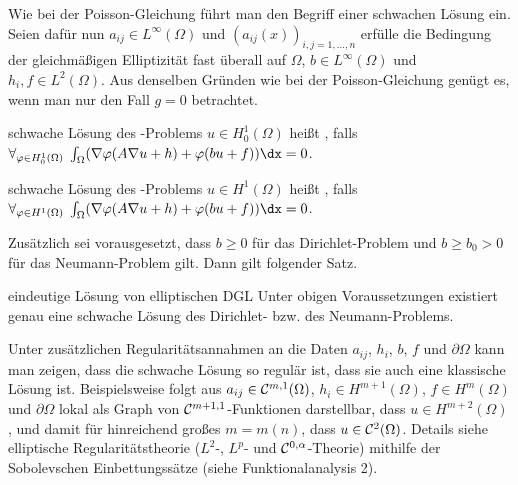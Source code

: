 \linie
\pagebreak

\begin{Bem}
    Wie bei der Poisson-Gleichung führt man den Begriff einer schwachen Lösung ein.
    Seien dafür nun $a_{ij} \in L^\infty(\Omega)$ und $(a_{ij}(x))_{i,j=1,\dotsc,n}$
    erfülle die Bedingung der gleichmäßigen Elliptizität fast überall auf $\Omega$,
    $b \in L^\infty(\Omega)$ und $h_i, f \in L^2(\Omega)$.
    Aus denselben Gründen wie bei der Poisson-Gleichung genügt es, wenn man nur den Fall $g = 0$
    betrachtet.
\end{Bem}

\begin{Def}{schwache Lösung des -Problems}
    $u \in H_0^1(\Omega)$ heißt ,
    falls
    $\forall_{\varphi \in H_0^1(\Omega)}\;
    \int_\Omega (\nabla \varphi (A \nabla u + h) + \varphi(bu + f))\dx = 0$.
\end{Def}

\begin{Def}{schwache Lösung des -Problems}
    $u \in H^1(\Omega)$ heißt ,
    falls
    $\forall_{\varphi \in H^1(\Omega)}\;
    \int_\Omega (\nabla \varphi (A \nabla u + h) + \varphi(bu + f))\dx = 0$.
\end{Def}

\begin{Bem}
    Zusätzlich sei vorausgesetzt, dass $b \ge 0$ für das Dirichlet-Problem und
    $b \ge b_0 > 0$ für das Neumann-Problem gilt.
    Dann gilt folgender Satz.
\end{Bem}

\begin{Satz}{eindeutige Lösung von elliptischen DGL}
    Unter obigen Voraussetzungen existiert genau eine schwache Lösung des Dirichlet-
    bzw. des Neumann-Problems.
\end{Satz}

\begin{Bem}
    Unter zusätzlichen Regularitätsannahmen an die Daten $a_{ij}$, $h_i$, $b$, $f$ und
    $\partial\Omega$ kann man zeigen, dass die schwache Lösung so regulär ist,
    dass sie auch eine klassische Lösung ist.
    Beispielsweise folgt aus $a_{ij} \in \mathcal{C}^{m,1}(\Omega)$, $h_i \in H^{m+1}(\Omega)$,
    $f \in H^m(\Omega)$ und $\partial\Omega$ lokal als Graph von $\mathcal{C}^{m+1,1}$-Funktionen
    darstellbar, dass $u \in H^{m+2}(\Omega)$,
    und damit für hinreichend großes $m = m(n)$, dass $u \in \mathcal{C}^2(\Omega)$.
    Details siehe elliptische Regularitätstheorie ($L^2$-, $L^p$- und $\mathcal{C}^{0,\alpha}$-Theorie)
    mithilfe der Sobolevschen Einbettungssätze (siehe Funktionalanalysis 2).
\end{Bem}

